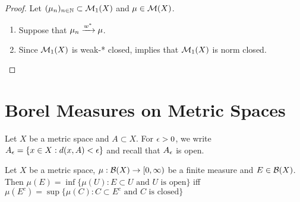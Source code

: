 \documentclass{book}
\begin{document}
	\begin{proof} Let $(\mu_n)_{n \in \mathbb{N}} \subset \mathcal{M}_1(X)$ and $\mu \in \mathcal{M}(X)$. 
		\begin{enumerate}
			\item Suppose that $\mu_n \xrightarrow{w^*} \mu$.
			\item Since $\mathcal{M}_1(X)$ is weak-* closed,  implies that $\mathcal{M}_1(X)$ is norm closed.
		\end{enumerate}
	\end{proof}










	
	
	
	
	
	
	
	
	
	
	

	
	
	
	
	
	
	
	
	
	
	
	
	\newpage
	\section{Borel Measures on Metric Spaces}
	\begin{note}
		Let $X$ be a metric space and $A \subset X$. For $\epsilon >0$, we write $A_{\epsilon} = \{x \in X: d(x, A) < \epsilon\}$ and recall that $A_{\epsilon}$ is open.
	\end{note}

	\begin{ex}
		Let $X$ be a metric space, $\mu: \mathcal{B}(X) \rightarrow [0,\infty)$ be a finite measure and $E \in \mathcal{B}(X)$. Then 
		$\mu(E) = \inf  \{\mu(U): E \subset U \text{ and $U$ is open} \}$ iff $\mu(E^c) = \sup  \{\mu(C): C \subset E^c \text{ and $C$ is closed} \}$ \\
	\end{ex}
\end{document}

